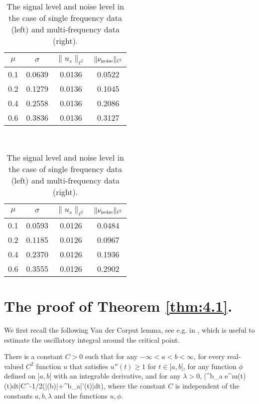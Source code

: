 \documentclass[11pt]{iopart}
\begin{document}
\begin{table}
\caption{The signal level and noise level in the case of single frequency data (left) and multi-frequency data (right).}\label{table1}

\begin{center}
\begin{tabular}{ | c | c| c | c |  }
\hline
$\mu$ & $\sigma$ & $\|u_s\|_{\ell^2}$      & $\|\nu_{\rm noise}\|_{\ell^2}$ \\ \hline
0.1    &    0.0639    & 0.0136    &   0.0522  \\ \hline
0.2    &    0.1279    & 0.0136    &   0.1045  \\ \hline
0.4    &    0.2558    & 0.0136    &   0.2086  \\ \hline
0.6    &    0.3836    & 0.0136    &   0.3127  \\ \hline
\end{tabular} \ \ \ \
\begin{tabular}{ | c | c| c | c |  }
\hline
$\mu$ & $\sigma$ & $\|u_s\|_{\ell^2}$      & $\|\nu_{\rm noise}\|_{\ell^2}$ \\ \hline
0.1     &   0.0593      & 0.0126    &   0.0484  \\ \hline
0.2     &   0.1185      & 0.0126    &   0.0967 \\ \hline
0.4     &   0.2370      & 0.0126    &   0.1936 \\ \hline
0.6     &   0.3555      & 0.0126    &   0.2902 \\ \hline
\end{tabular}
\end{center}
\end{table}

 \appendix
\section{The proof of Theorem \ref{thm:4.1}.}
\renewcommand{\thesection}{A}

We first recall the following Van der Corput lemma, see e.g. in \cite[Corollary 2.6.8]{grafakos}, which is useful to estimate the oscillatory integral around the critical point.

\begin{lem} \label{van}
There is a constant $C>0$ such that for any $-\infty<a<b<\infty$, for every real-valued $C^2$ function $u$ that
satisfies $u''(t)\ge 1$ for $t\in ]a,b[$, for any function $\phi$ defined on $]a,b[$ with an integrable derivative, and for any $\lambda>0$,
\ben
\left|\int^b_a e^{\i\lambda u(t)}\phi(t)dt\right|\le C\lambda^{-1/2}\left(|\phi(b)|+\int^b_a|\phi'(t)|dt\right),
\een
where the constant $C$ is independent of the constants $a,b,\lambda$ and the functions $u,\phi$.
\end{lem}
\end{document}
